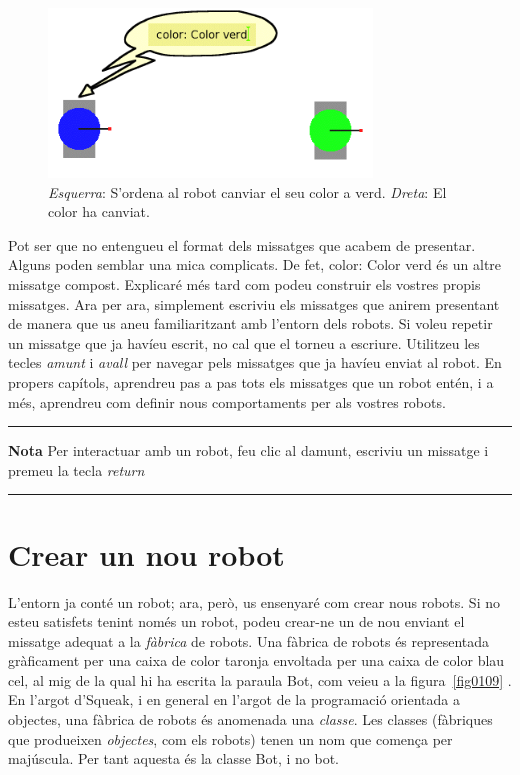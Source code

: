 \begin{figure}[h]
\begin{center}
\includegraphics[height=45mm ,width=86mm ]{Imatges/figura1-8.png}
\end{center}
\caption{\emph{Esquerra}: S'ordena al robot canviar el seu color a verd. \emph{Dreta}: El color ha canviat.}
\label{fig0108}
\end{figure}

Pot ser que no entengueu el format dels missatges que acabem de presentar. Alguns poden semblar una mica complicats. De fet, \textsf{color: Color verd} és un altre missatge compost. Explicaré més tard com podeu construir els vostres propis missatges. Ara per ara, simplement escriviu els missatges que anirem presentant de manera que us aneu familiaritzant amb l'entorn dels robots. Si voleu repetir un missatge que ja havíeu escrit, no cal que el torneu a escriure. Utilitzeu les tecles \emph{amunt} i \emph{avall} per navegar pels missatges que ja havíeu enviat al robot. En propers capítols, aprendreu pas a pas tots els missatges que un robot entén, i a més, aprendreu com definir nous comportaments per als vostres robots. 

\noindent
\rule{\textwidth}{2pt}
\noindent
\textbf{Nota} Per interactuar amb un robot, feu clic al damunt, escriviu un missatge i premeu la tecla \emph{return}\\
\noindent
\rule{\textwidth}{2pt}

\section{Crear un nou robot}
L'entorn ja conté un robot; ara, però, us ensenyaré com crear nous robots. Si no esteu satisfets tenint només un robot, podeu crear-ne un de nou enviant el missatge adequat a la \emph{fàbrica} de robots. Una fàbrica de robots és representada gràficament per una caixa  de color taronja envoltada per una caixa de color blau cel, al mig de la qual hi ha escrita la paraula \textsf{Bot}, com veieu a la figura~\ref{fig0109} . En l'argot d'Squeak, i en general en l'argot de la programació orientada a objectes, una fàbrica de robots és anomenada una \emph{classe}. Les classes (fàbriques que produeixen \emph{objectes}, com els robots) tenen un nom que comença per majúscula. Per tant aquesta és la classe \textsf{Bot}, i no \textsf{bot}.

